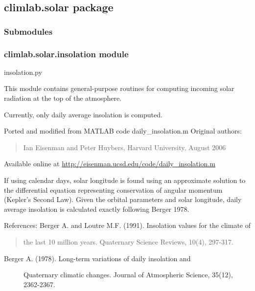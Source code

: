 \documentclass[letterpaper,10pt,english]{sphinxmanual}
\begin{document}
\subsection{climlab.solar package}
\label{api/climlab.solar::doc}\label{api/climlab.solar:climlab-solar-package}

\subsubsection{Submodules}
\label{api/climlab.solar:submodules}

\subsubsection{climlab.solar.insolation module}
\label{api/climlab.solar:module-climlab.solar.insolation}\label{api/climlab.solar:climlab-solar-insolation-module}
insolation.py

This module contains general-purpose routines for computing incoming
solar radiation at the top of the atmosphere.

Currently, only daily average insolation is computed.

Ported and modified from MATLAB code daily\_insolation.m
Original authors:
\begin{quote}

Ian Eisenman and Peter Huybers, Harvard University, August 2006
\end{quote}

Available online at \href{http://eisenman.ucsd.edu/code/daily\_insolation.m}{http://eisenman.ucsd.edu/code/daily\_insolation.m}

If using calendar days, solar longitude is found using an
approximate solution to the differential equation representing conservation
of angular momentum (Kepler's Second Law).  Given the orbital parameters
and solar longitude, daily average insolation is calculated exactly
following Berger 1978.

References:
Berger A. and Loutre M.F. (1991). Insolation values for the climate of
\begin{quote}

the last 10 million years. Quaternary Science Reviews, 10(4), 297-317.
\end{quote}
\begin{description}
\item[{Berger A. (1978). Long-term variations of daily insolation and}] \leavevmode
Quaternary climatic changes. Journal of Atmospheric Science, 35(12),
2362-2367.

\end{description}
\end{document}
